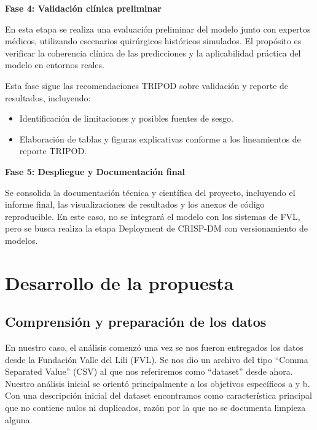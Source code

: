 \documentclass[12pt, letterpaper]{article}
\begin{document}
\textbf{Fase 4: Validación clínica preliminar}

En esta etapa se realiza una evaluación preliminar del modelo junto con expertos médicos, utilizando escenarios quirúrgicos históricos simulados. El propósito es verificar la coherencia clínica de las predicciones y la aplicabilidad práctica del modelo en entornos reales.

Esta fase sigue las recomendaciones TRIPOD sobre validación y reporte de resultados, incluyendo:

\begin{itemize}
    \item Identificación de limitaciones y posibles fuentes de sesgo.
    \item Elaboración de tablas y figuras explicativas conforme a los lineamientos de reporte TRIPOD.
\end{itemize}

\textbf{Fase 5: Despliegue y Documentación final}

Se consolida la documentación técnica y científica del proyecto, incluyendo el informe final, las visualizaciones de resultados y los anexos de código reproducible. En este caso, no se integrará el modelo con los sistemas de FVL, pero se busca realiza la etapa Deployment de CRISP-DM con versionamiento de modelos.

\newpage

\section{Desarrollo de la propuesta}

\subsection{Comprensión y preparación de los datos}

En nuestro caso, el análisis comenzó una vez se nos fueron entregados los datos desde la Fundación Valle del Lili (FVL). Se nos dio un archivo del tipo ``Comma Separated Value'' (CSV) al que nos referiremos como ``dataset'' desde ahora. Nuestro análisis inicial se orientó principalmente a los objetivos específicos a y b. Con una descripción inicial del dataset encontramos como característica principal que no contiene nulos ni duplicados, razón por la que no se documenta limpieza alguna.
\end{document}
